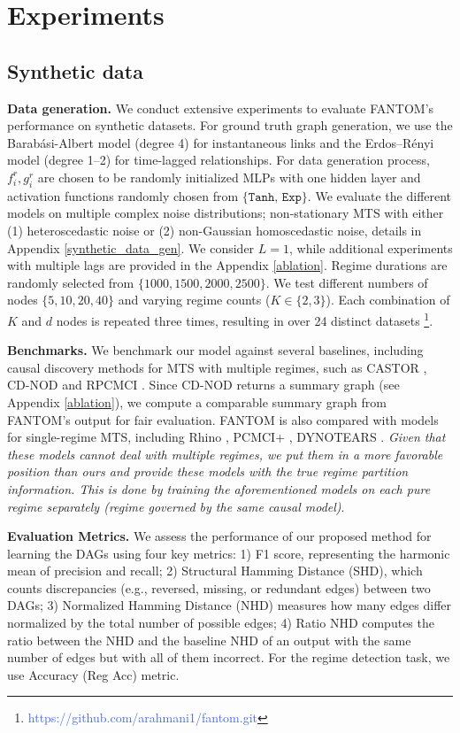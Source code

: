 \section{Experiments}\label{sec:experiments}
\subsection{Synthetic data}
\textbf{Data generation. }We conduct extensive experiments to evaluate FANTOM's performance on synthetic datasets. For ground truth graph generation, we use the Barabási-Albert model (degree 4) for instantaneous links and the Erdos–Rényi model (degree 1–2) for time-lagged relationships. For data generation process, $f^r_i, g^r_i$ are chosen to be randomly initialized MLPs with one hidden layer and activation functions randomly chosen from $\{\texttt{Tanh, Exp}\}$. We evaluate the different models on multiple complex noise distributions; non-stationary MTS with either (1) heteroscedastic noise or (2) non-Gaussian homoscedastic noise, details in Appendix \ref{synthetic_data_gen}. We consider $L = 1$, while additional experiments with multiple lags are provided in the Appendix \ref{ablation}. Regime durations are randomly selected from $\{1000, 1500, 2000, 2500\}$. We test different numbers of nodes $\{5, 10, 20, 40\}$ and varying regime counts ($K \in \{2, 3\}$). Each combination of $K$ and $d$ nodes is repeated three times, resulting in over 24 distinct datasets \footnote{\textcolor{RoyalBlue}{https://github.com/arahmani1/fantom.git}}.

\textbf{Benchmarks. }We benchmark our model against several baselines, including causal discovery methods for MTS with multiple regimes, such as CASTOR \citep{rahmanicausal}, CD-NOD \citep{huang2020causal} and RPCMCI \citep{saggioro2020reconstructing}. Since CD-NOD returns a summary graph (see Appendix \ref{ablation}), we compute a comparable summary graph from FANTOM's output for fair evaluation. FANTOM is also compared with models for single-regime MTS, including Rhino \citep{gong2022rhino}, PCMCI+ \citep{runge2020discovering}, DYNOTEARS \citep{pamfil2020dynotears}.
\textit{Given that these models cannot deal with multiple regimes, we put them in a more favorable position than ours and provide these models with the true regime partition information. This is done by training the aforementioned models on each pure regime separately (regime governed by the same causal model)}.

\textbf{Evaluation Metrics. }We assess the performance of our proposed method for learning the DAGs using four key metrics: 1) F1 score, representing the harmonic mean of precision and recall; 2) Structural Hamming Distance (SHD), which counts discrepancies (e.g., reversed, missing, or redundant edges) between two DAGs; 3) Normalized Hamming Distance (NHD) measures how many edges differ normalized by the total number of possible edges; 4) Ratio NHD computes the ratio between the NHD and the baseline NHD of an output with the same number of edges but with all of them incorrect. For the regime detection task, we use Accuracy (Reg Acc) metric.

